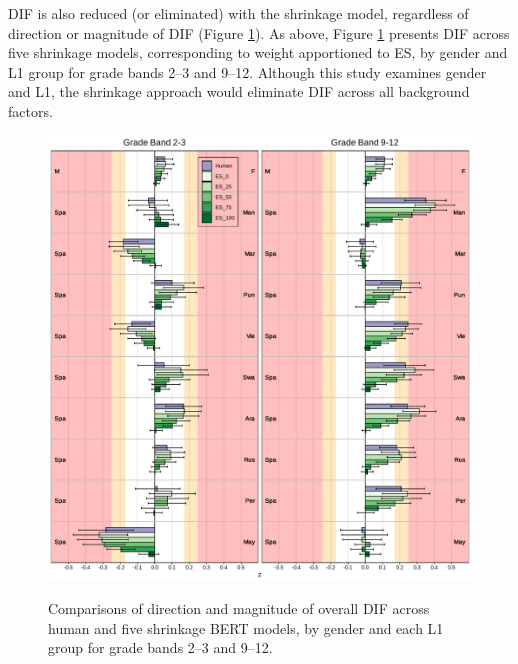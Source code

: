 \documentclass [PhD] {uclathes}
\begin{document}
DIF is also reduced (or eliminated) with the shrinkage model, regardless of direction or magnitude of DIF (Figure \ref{fig:shrinkBERT_z_ovr}). As above, Figure \ref{fig:shrinkBERT_z_ovr} presents DIF across five shrinkage models, corresponding to weight apportioned to ES, by gender and L1 group for grade bands 2–3 and 9–12. Although this study examines gender and L1, the shrinkage approach would eliminate DIF across all background factors. 

\begin{figure}[!htb]
    \centering
    \caption{Comparisons of direction and magnitude of overall DIF across human and five shrinkage BERT models, by gender and each L1 group for grade bands 2–3 and 9–12.}    
    \includegraphics[width=6in]{figures/20230425_ETS-DIF_ES_z_ovr_edit.pdf}
    \label{fig:shrinkBERT_z_ovr}

\end{figure}
\end{document}
